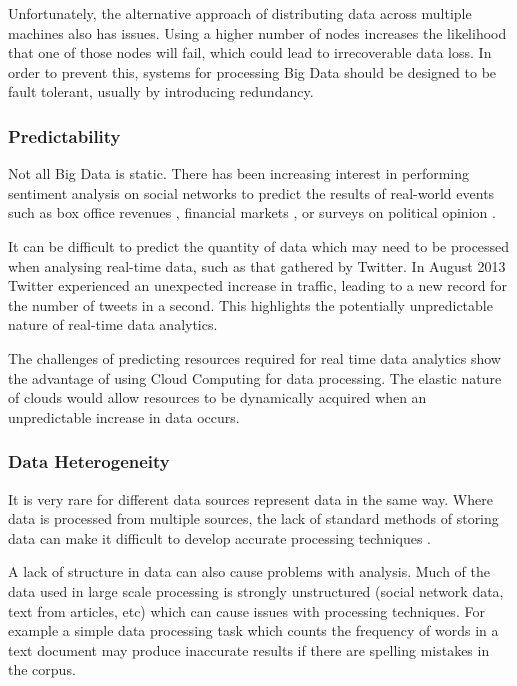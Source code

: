 Unfortunately, the alternative approach of distributing data across multiple machines also has issues. Using a higher number of nodes increases the likelihood that one of those nodes will fail, which could lead to irrecoverable data loss. In order to prevent this, systems for processing Big Data should be designed to be fault tolerant, usually by introducing redundancy.

\subsubsection{Predictability}
Not all Big Data is static. There has been increasing interest in performing sentiment analysis on social networks to predict the results of real-world events such as box office revenues \cite{asur2010predicting}, financial markets \cite{bollen2011twitter}, or surveys on political opinion \cite{o2010tweets}. 

It can be difficult to predict the quantity of data which may need to be processed when analysing real-time data, such as that gathered by Twitter. In August 2013 Twitter experienced an unexpected increase in traffic, leading to a new record for the number of tweets in a second. This highlights the potentially unpredictable nature of real-time data analytics. 

The challenges of predicting resources required for real time data analytics show the advantage of using Cloud Computing for data processing. The elastic nature of clouds would allow resources to be dynamically acquired when an unpredictable increase in data occurs. 

\subsubsection{Data Heterogeneity}
It is very rare for different data sources represent data in the same way. Where data is processed from multiple sources, the lack of standard methods of storing data can make it difficult to develop accurate processing techniques \cite{cuzzocrea2011analytics}. 

A lack of structure in data can also cause problems with analysis. Much of the data used in large scale processing is strongly unstructured (social network data, text from articles, etc) which can cause issues with processing techniques. For example a simple data processing task which counts the frequency of words in a text document may produce inaccurate results if there are spelling mistakes in the corpus. 

